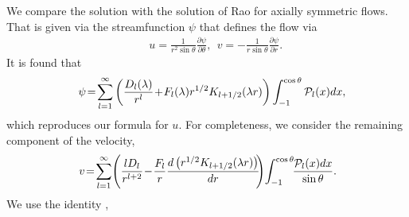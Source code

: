 \documentclass[aps,prx,twocolumn,amsmath,amssymb,amsfonts]{revtex4-2}
\begin{document}
{{\begin{appendices}
We compare the solution with the solution of Rao \cite{rao} for axially symmetric flows. That is given via the streamfunction $\psi$ that defines the flow via
\begin{eqnarray}&&\!\!\!\!\!\!\!\!\!\!\!\!
u=\frac{1}{r^2\sin\theta}\frac{\partial \psi}{\partial \theta},\ \ v=-\frac{1}{r\sin\theta}\frac{\partial \psi}{\partial r}.
\end{eqnarray}
It is found that \cite{rao}
\begin{eqnarray}&&
\psi\!=\!\sum_{l=1}^{\infty}\left(\frac{D_l(\lambda)}{r^l}\!+\!F_l(\lambda)r^{1/2}K_{l+1/2}(\lambda r) \right)\int_{-1}^{\cos\theta}{\cal P}_l(x)dx,\nonumber
\end{eqnarray}
which reproduces our formula for $u$. For completeness,
we consider the remaining component of the velocity,
\begin{eqnarray}&&\!\!\!\!\!
v\!=\!\sum_{l=1}^{\infty}\!\left(\frac{l D_l}{r^{l+2}}\!-\!\frac{F_l}{r}\frac{d\left(r^{1/2}K_{l+1/2}(\lambda r)\right)}{dr}\!\! \right)\!
\int_{-1}^{\cos\theta}\!\!\frac{{\cal P}_l(x)dx}{\sin\theta}.\nonumber
\end{eqnarray}
We use the identity \cite{lighthill},
\begin{eqnarray}&&\!\!\!\!\!\!\!\!\!\!\!\!

\end{eqnarray}
\end{appendices}}}
\end{document}
